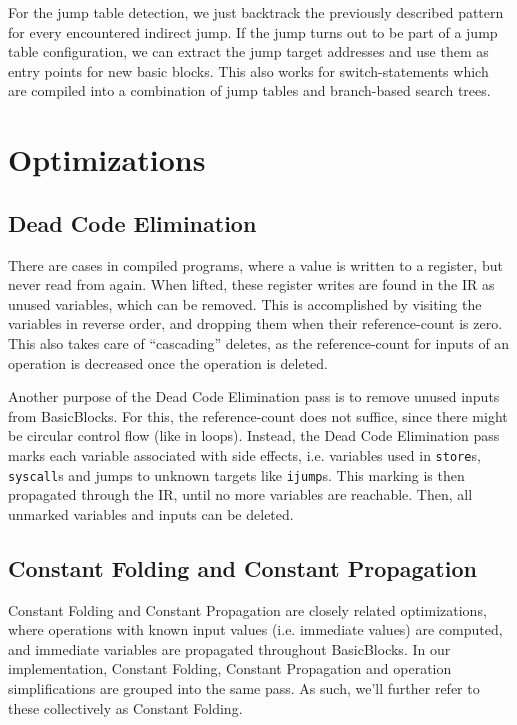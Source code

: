 \documentclass[course=eragp]{aspdoc}
\begin{document}
\par

For the jump table detection, we just backtrack the previously described pattern for every
encountered indirect jump. If the jump turns out to be part of a jump table configuration, we can
extract the jump target addresses and use them as entry points for new basic blocks. This also works
for switch-statements which are compiled into a combination of jump tables and branch-based search
trees.

\section{Optimizations}
\subsection{Dead Code Elimination}\label{dead_code_elimination}

There are cases in compiled programs, where a value is written to a register, but never read from again.
When lifted, these register writes are found in the IR as unused variables, which can be removed.
This is accomplished by visiting the variables in reverse order, and dropping them when their reference-count is zero.
This also takes care of ``cascading'' deletes, as the reference-count for inputs of an operation is decreased once the
operation is deleted.

Another purpose of the Dead Code Elimination pass is to remove unused inputs from BasicBlocks. For this, the
reference-count does not suffice, since there might be circular control flow (like in loops). Instead, the Dead Code
Elimination pass marks each variable associated with side effects, i.e. variables used in \texttt{store}s,
\texttt{syscall}s and jumps to unknown targets like \texttt{ijump}s. This marking is then propagated through the IR,
until no more variables are reachable. Then, all unmarked variables and inputs can be deleted.

\subsection{Constant Folding and Constant Propagation}\label{constant_folding}

Constant Folding and Constant Propagation are closely related optimizations, where operations with known input values
(i.e. immediate values) are computed, and immediate variables are propagated throughout BasicBlocks.
In our implementation, Constant Folding, Constant Propagation and operation simplifications are grouped into the same
pass.  As such, we'll further refer to these collectively as Constant Folding.
\end{document}

